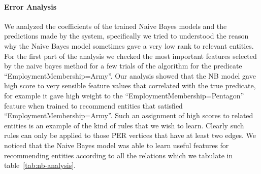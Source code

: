 \documentclass[paper=a4,fontsize=11pt]{scrartcl}
\newcommand{\tabref}[1]{table~\ref{#1}}
\numberwithin{equation}{section}    %
\numberwithin{figure}{section}      %
\numberwithin{table}{section}       %
\begin{document}
\paragraph{Error Analysis}
We analyzed the coefficients of the trained Naive Bayes models and the predictions made by the system, specifically we tried to understood the reason why the Naive Bayes model sometimes gave a very low rank to relevant entities.
For the first part of the analysis we checked the most important features selected by the naive bayes method for
a few trials of the algorithm for the predicate ``EmploymentMembership=Army''.
Our analysis showed that the NB model gave high score to very sensible feature
values that correlated with the true predicate, for example it gave high weight to the ``EmploymentMembership=Pentagon''
feature when trained to recommend entities that satisfied ``EmploymentMembership=Army''.
Such an assignment of high scores to related entities is an example of the kind of
rules that we wish to learn. Clearly such rules can only be applied to those
\textsc{PER} vertices that have at least two edges. We noticed that the Naive Bayes model was able to learn useful features for recommending entities according to all the relations which we tabulate in \tabref{tab:nb-analysis}.
\end{document}
